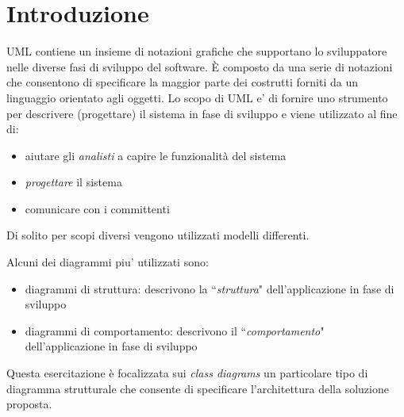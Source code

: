 \documentclass{article}
\begin{document}
\maketitle



\newpage
\tableofcontents
\newpage



\section{Introduzione}
UML contiene un insieme di notazioni grafiche che supportano lo sviluppatore nelle diverse fasi di sviluppo del software. \`E composto da una serie di notazioni che consentono di specificare la maggior parte dei costrutti  forniti da un linguaggio orientato agli oggetti. Lo scopo di UML e' di fornire uno strumento  per descrivere (progettare) il sistema in fase di sviluppo e viene utilizzato al fine di:
\begin{itemize}
\item aiutare gli \emph{analisti} a capire le funzionalit\`a del sistema
\item \emph{progettare} il sistema
\item comunicare con i committenti
\end{itemize}
Di solito per scopi diversi vengono utilizzati modelli differenti.

Alcuni dei diagrammi piu' utilizzati sono:
\begin{itemize}
\item diagrammi di struttura: descrivono la ``\emph{struttura}" dell'applicazione in fase di sviluppo
\item diagrammi di comportamento: descrivono il ``\emph{comportamento}" dell'applicazione in fase di sviluppo
\end{itemize}

Questa esercitazione \`e focalizzata sui \emph{class diagrams} un particolare tipo di diagramma strutturale che consente di specificare l'architettura della soluzione proposta.
\end{document}
